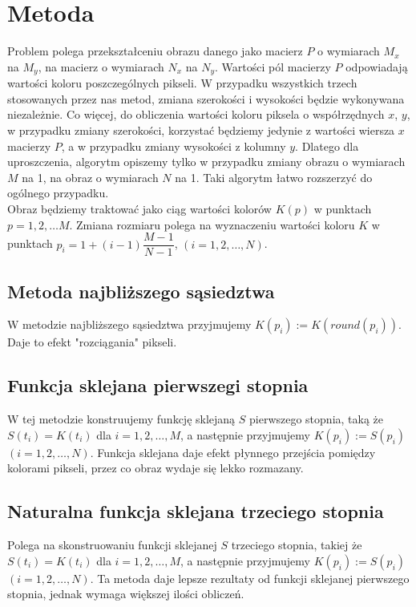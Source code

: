 \documentclass{mwart}
\theoremstyle{definition}
\begin{document}
\section{Metoda}
\label{sec:metoda}
Problem polega przekształceniu obrazu danego jako macierz $P$ o wymiarach $M_x$ na $M_y$, na macierz o wymiarach $N_x$ na $N_y$. Wartości pól macierzy $P$ odpowiadają wartości koloru poszczególnych pikseli. W przypadku wszystkich trzech stosowanych przez nas metod, zmiana szerokości i wysokości będzie wykonywana niezależnie. Co więcej, do obliczenia wartości koloru piksela o współrzędnych $x$, $y$, w przypadku zmiany szerokości, korzystać będziemy jedynie z wartości wiersza $x$ macierzy $P$, a w przypadku zmiany wysokości z kolumny $y$. Dlatego dla uproszczenia, algorytm opiszemy tylko w przypadku zmiany obrazu o wymiarach $M$ na 1, na obraz o wymiarach $N$ na 1. Taki algorytm łatwo rozszerzyć do ogólnego przypadku. \\
\indent Obraz będziemy traktować jako ciąg wartości kolorów $K(p)$ w punktach $p = 1, 2, \dots M$. Zmiana rozmiaru polega na wyznaczeniu wartości koloru $K$ w punktach $p_i = 1 +(i-1)\dfrac{M-1}{N-1}$, $(i = 1, 2, \dots , N)$.

\subsection{Metoda najbliższego sąsiedztwa}
W metodzie najbliższego sąsiedztwa przyjmujemy $K(p_i) := K(round(p_i))$. Daje to efekt "rozciągania" pikseli. 

\subsection{Funkcja sklejana pierwszegi stopnia}
W tej metodzie konstruujemy funkcję sklejaną $S$ pierwszego stopnia, taką że $S(t_i) = K(t_i)$ dla $i = 1, 2, \dots, M$, a następnie przyjmujemy $K(p_i) := S(p_i)$ $(i = 1, 2, \dots, N)$. Funkcja sklejana daje efekt płynnego przejścia pomiędzy kolorami pikseli, przez co obraz wydaje się lekko rozmazany.

\subsection{Naturalna funkcja sklejana trzeciego stopnia}
Polega na skonstruowaniu funkcji sklejanej $S$ trzeciego stopnia, takiej że $S(t_i) = K(t_i)$ dla $i = 1, 2, \dots, M$, a następnie przyjmujemy $K(p_i) := S(p_i)$ $(i = 1, 2, \dots, N)$. Ta metoda daje lepsze rezultaty od funkcji sklejanej pierwszego stopnia,
jednak wymaga większej ilości obliczeń.
\end{document}
